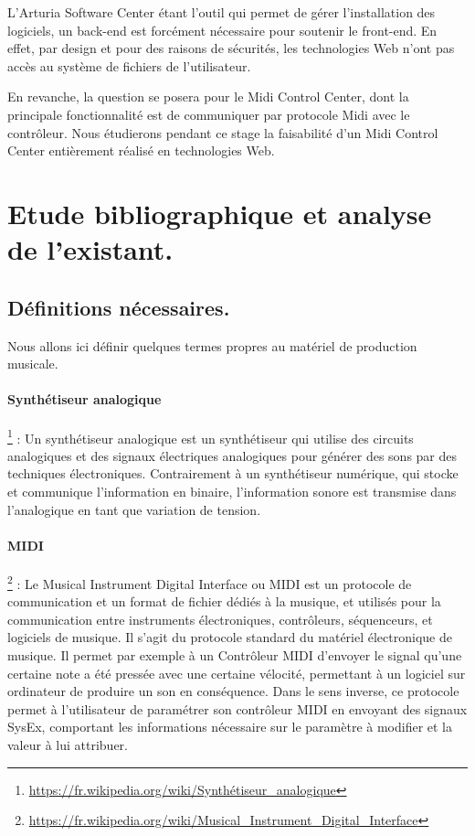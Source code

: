 \documentclass[francais]{rapportPFE}  %
\begin{document}
L'Arturia Software Center étant l'outil qui permet de gérer l'installation des logiciels, un back-end est forcément nécessaire pour soutenir le front-end. En effet, par design et pour des raisons de sécurités, les technologies Web n'ont pas accès au système de fichiers de l'utilisateur.

En revanche, la question se posera pour le Midi Control Center, dont la principale fonctionnalité est de communiquer par protocole Midi avec le contrôleur. Nous étudierons pendant ce stage la faisabilité d'un Midi Control Center entièrement réalisé en technologies Web.

\section{Etude bibliographique et analyse de l'existant.}


\subsection{Définitions nécessaires.}

Nous allons ici définir quelques termes propres au matériel de production musicale.
\paragraph{Synthétiseur analogique} \footnote{\url{https://fr.wikipedia.org/wiki/Synthétiseur_analogique}} 
:
 Un synthétiseur analogique est un synthétiseur qui utilise des circuits analogiques et des signaux électriques analogiques pour générer des sons par des techniques électroniques. Contrairement à un synthétiseur numérique, qui stocke et communique l'information en binaire, l'information sonore est transmise dans l'analogique en tant que variation de tension.
\paragraph{MIDI} \footnote{\url{https://fr.wikipedia.org/wiki/Musical_Instrument_Digital_Interface}} 
: Le Musical Instrument Digital Interface ou MIDI est un protocole de communication et un format de fichier dédiés à la musique, et utilisés pour la communication entre instruments électroniques, contrôleurs, séquenceurs, et logiciels de musique. Il s'agit du protocole standard du matériel électronique de musique. Il permet par exemple à un Contrôleur MIDI d'envoyer le signal qu'une certaine note a été pressée avec une certaine vélocité, permettant à un logiciel sur ordinateur de produire un son en conséquence. Dans le sens inverse, ce protocole permet à l'utilisateur de paramétrer son contrôleur MIDI en envoyant des signaux SysEx, comportant les informations nécessaire sur le paramètre à modifier et la valeur à lui attribuer.
\end{document}
